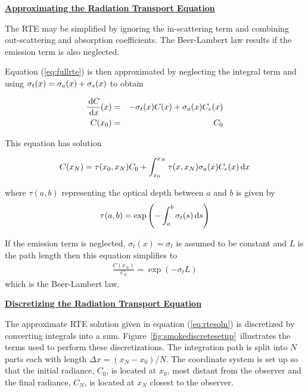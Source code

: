 \documentclass[11pt]{article}
\newcommand{\ssubsection}[1]{\underline{\bf #1}}
\begin{document}

\ssubsection{Approximating the Radiation Transport Equation}

The RTE may be simplified by ignoring the in-scattering term and combining out-scattering
and absorption coefficients.  The Beer-Lambert law results if the emission term is also
neglected.

Equation (\ref{eq:fullrte}) is then approximated by neglecting the
integral term and using $\sigma_t(x)=\sigma_a(x)+\sigma_s(x)$ to obtain

\begin{eqnarray}
\frac{\,\mbox{d}C}{\,\mbox{d}x}(x)&=&-\sigma_t(x) C(x) + \sigma_a(x) C_e(x)\\
 C(x_0)&=&C_0
\end{eqnarray}

\noindent This equation has solution

\begin{equation}
\label{eq:rtesoln}
 C(x_N)=\tau(x_0,x_N)C_0 + \int_{x_0}^{x_N}\tau(x,x_N)\sigma_a(x)C_e(x) \,\mbox{d}x
\end{equation}

\noindent where $\tau(a,b)$ representing the optical depth between $a$ and $b$ is given by
\begin{equation}
\label{eq:optdepth}
\tau(a,b)=\exp\left({-\int_{a}^{b} \sigma_t(s) \,\mbox{d}s}\right)
\end{equation}

\noindent If the emission term is neglected, $\sigma_t(x)=\sigma_t$ is assumed to be constant
and $L$ is the path length then this equation simplifies to
\begin{eqnarray}
 \frac{C(x_N)}{C_0}=\exp(-\sigma_tL)
\end{eqnarray}
which is the Beer-Lambert law.


\ssubsection{Discretizing the Radiation Transport Equation}

\newcommand{\htau}[1]{\tau_{#1}^{N-1}}
\newcommand{\halpha}[1]{\alpha_{#1}^{N-1}}
\newcommand{\sigai}[1]{\sigma_{a,#1}}
\newcommand{\Lei}[1]{C_{e,#1}}
\newcommand{\Lhatj}[1]{C_{#1}^N}
\newcommand{\Lhatjj}[1]{\hat{C}_{#1}^N}
\newcommand{\Chatjj}[1]{\hat{C}_{#1}^N}
\newcommand{\Leii}[1]{\hat{C}_{e,#1}}

The approximate RTE solution given in equation (\ref{eq:rtesoln}) is
discretized by converting integrals into a sum. Figure~\ref{fig:smokediscretesetup}\ illustrates the terms used to
perform these discretizations.  The integration path is split into $N$ parts
each with length $\Delta x=(x_N-x_0)/N$.  The coordinate system is
set up so that the initial radiance, $C_0$, is located at $x_0$,
most distant from the observer and the final radiance, $C_N$, is
located at $x_N$ closest to the observer.
\end{document}
